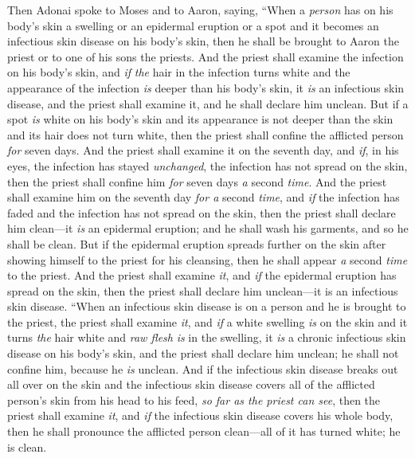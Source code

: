 \begin{biblechapter} %
 Then Adonai spoke to Moses and to Aaron, saying,
\verse “When a \textit{person} has on his body’s skin a swelling or an epidermal eruption or a spot and it becomes an infectious skin disease on his body’s skin, then he shall be brought to Aaron the priest or to one of his sons the priests.
\verse And the priest shall examine the infection on his body’s skin, and \textit{if} \textit{the} hair in the infection turns white and the appearance of the infection \textit{is} deeper than his body’s skin, it \textit{is} an infectious skin disease, and the priest shall examine it, and he shall declare him unclean.
\verse But if a spot \textit{is} white on his body’s skin and its appearance is not deeper than the skin and its hair does not turn white, then the priest shall confine the afflicted person \textit{for} seven days.
\verse And the priest shall examine it on the seventh day, and \textit{if}, in his eyes, the infection has stayed \textit{unchanged}, the infection has not spread on the skin, then the priest shall confine him \textit{for} seven days \textit{a} second \textit{time}.
\verse And the priest shall examine him on the seventh day \textit{for a} second \textit{time}, and \textit{if} the infection has faded and the infection has not spread on the skin, then the priest shall declare him clean—it \textit{is} an epidermal eruption; and he shall wash his garments, and so he shall be clean.
\verse But if the epidermal eruption spreads further on the skin after showing himself to the priest for his cleansing, then he shall appear \textit{a} second \textit{time} to the priest.
\verse And the priest shall examine \textit{it}, and \textit{if} the epidermal eruption has spread on the skin, then the priest shall declare him unclean—it is an infectious skin disease.
\verse “When an infectious skin disease is on a person and he is brought to the priest,
\verse the priest shall examine \textit{it}, and \textit{if} a white swelling \textit{is} on the skin and it turns \textit{the} hair white and \textit{raw flesh} \textit{is} in the swelling,
\verse it \textit{is} a chronic infectious skin disease on his body’s skin, and the priest shall declare him unclean; he shall not confine him, because he \textit{is} unclean.
\verse And if the infectious skin disease breaks out all over on the skin and the infectious skin disease covers all of the afflicted person’s skin from his head to his feed, \textit{so far as the priest can see},
\verse then the priest shall examine \textit{it}, and \textit{if} the infectious skin disease covers his whole body, then he shall pronounce the afflicted person clean—all of it has turned white; he is clean.

\end{biblechapter}

